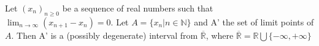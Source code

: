 \documentclass[12pt]{article}
\begin{document}
Let $(x_n)_{n\geq 0}$ be a sequence of real numbers such that $\displaystyle \lim_{n
\rightarrow \infty} (x_{n+1}-x_n) = 0$. Let $A=\{ x_n \vert n \in \mathbb{N} \}$ and A' the set of limit points of $A$.
Then A' is a (possibly degenerate) interval from $\overline{\mathbb{R}}$, where $\overline{\mathbb{R}}=\mathbb{R} \bigcup \{-\infty,+\infty\}$
\end{document}

